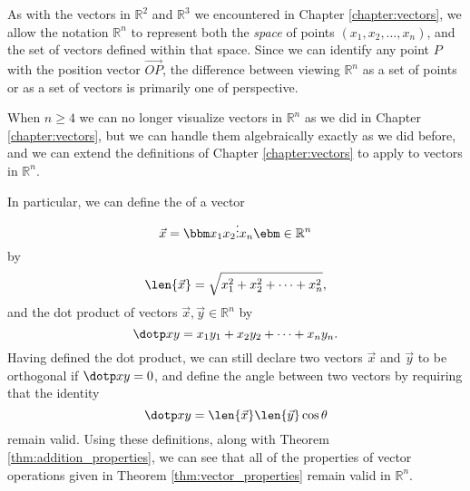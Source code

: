 As with the vectors in $\mathbb{R}^2$ and $\mathbb{R}^3$ we encountered in Chapter \ref{chapter:vectors}, we allow the notation $\mathbb{R}^n$ to represent both the \textit{space} of points $(x_1,x_2, \ldots, x_n)$, and the set of vectors defined within that space. Since we can identify any point $P$ with the position vector $\overrightarrow{OP}$, the difference between viewing $\mathbb{R}^n$ as a set of points or as a set of vectors is primarily one of perspective.

When $n\geq 4$ we can no longer visualize vectors in $\mathbb{R}^n$ as we did in Chapter \ref{chapter:vectors}, but we can handle them algebraically exactly as we did before, and we can extend the definitions of Chapter \ref{chapter:vectors} to apply to vectors in $\mathbb{R}^n$.

In particular, we can define the  of a vector 
\[
\vec{x}=\bbm x_1\\x_2\\ \vdots\\ x_n\ebm\in\mathbb{R}^n
\] 
by
\[
\len{\vec{x}} = \sqrt{x_1^2+x_2^2+\cdots +x_n^2},
\]
and the dot product of vectors $\vec{x}, \vec{y}\in\mathbb{R}^n$ by
\[
\dotp xy = x_1y_1+x_2y_2+\cdots + x_ny_n.
\]
Having defined the dot product, we can still declare two vectors $\vec x$ and $\vec y$ to be orthogonal if $\dotp xy = 0$, and define the angle between two vectors by requiring that the identity
\[
\dotp xy = \len{\vec{x}}\len{\vec{y}}\cos\theta
\]
remain valid. Using these definitions, along with Theorem \ref{thm:addition_properties}, we can see that all of the properties of vector operations given in Theorem \ref{thm:vector_properties} remain valid in $\mathbb{R}^n$.

\smallskip

